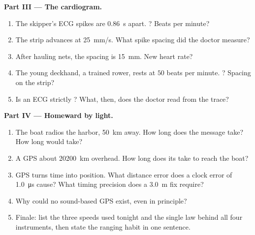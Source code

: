 \begin{problem}[{Weekend problem --- reading the world's signals: one
law, $d = v\,t$, ranges a storm, maps a seabed, counts a heartbeat and
teases out how GPS works}]
\medskip
\noindent\textbf{Part III --- The cardiogram.}
\begin{enumerate}[resume]
  \item The skipper's ECG spikes are \qty{0.86}{s} apart. ?
        Beats per minute?
  \item The strip advances at \qty{25}{mm/s}. What spike spacing did the
        doctor measure?
  \item After hauling nets, the spacing is \qty{15}{mm}. New heart rate?
  \item The young deckhand, a trained rower, rests at $50$ beats per
        minute. ? Spacing on the strip?
  \item Is an ECG strictly ? What, then, does the doctor read
        from the trace?
\end{enumerate}

\medskip
\noindent\textbf{Part IV --- Homeward by light.}
\begin{enumerate}[resume]
  \item The boat radios the harbor, \qty{50}{km} away. How long does the
        message take? How long would  take?
  \item A GPS   about \qty{20200}{km} overhead. How long
        does its  take to reach the boat?
  \item GPS turns time into position. What distance error does a clock
        error of \qty{1.0}{\micro s} cause? What timing precision does a
        \qty{3.0}{m} fix require?
  \item Why could no sound-based GPS exist, even in principle?
  \item Finale: list the three speeds used tonight and the single law
        behind all four instruments, then state the ranging habit in one
        sentence.
\end{enumerate}
\end{problem}
